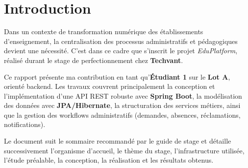 \chapter*{Introduction}

Dans un contexte de transformation numérique des établissements d'enseignement, la centralisation des processus administratifs et pédagogiques devient une nécessité. C'est dans ce cadre que s'inscrit le projet \textit{EduPlatform}, réalisé durant le stage de perfectionnement chez \textbf{Techvant}.

Ce rapport présente ma contribution en tant qu'\textbf{Étudiant 1} sur le \textbf{Lot A}, orienté backend. Les travaux couvrent principalement la conception et l'implémentation d'une API REST robuste avec \textbf{Spring Boot}, la modélisation des données avec \textbf{JPA/Hibernate}, la structuration des services métiers, ainsi que la gestion des workflows administratifs (demandes, absences, réclamations, notifications).

Le document suit le sommaire recommandé par le guide de stage et détaille successivement l'organisme d'accueil, le thème du stage, l'infrastructure utilisée, l'étude préalable, la conception, la réalisation et les résultats obtenus.
